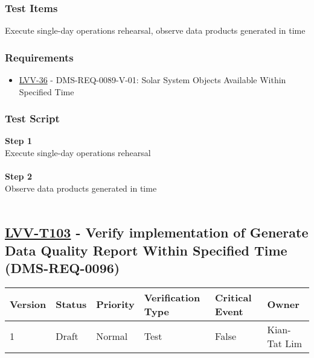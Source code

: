 \hypertarget{test-items-78}{%
\subsubsection{Test Items}\label{test-items-78}}

Execute single-day operations rehearsal, observe data products generated
in time

\hypertarget{requirements-79}{%
\subsubsection{Requirements}\label{requirements-79}}

\begin{itemize}
\tightlist
\item
  \href{https://jira.lsstcorp.org/browse/LVV-36}{LVV-36} -
  DMS-REQ-0089-V-01: Solar System Objects Available Within Specified
  Time
\end{itemize}

\hypertarget{test-script-79}{%
\subsubsection{Test Script}\label{test-script-79}}

\textbf{Step 1}\\
Execute single-day operations rehearsal\\
~\\
\textbf{Step 2}\\
\hspace*{0.333em}Observe data products generated in time\\
~\\

\hypertarget{lvv-t103---verify-implementation-of-generate-data-quality-report-within-specified-time-dms-req-0096}{%
\subsection{\texorpdfstring{\href{https://jira.lsstcorp.org/secure/Tests.jspa\#/testCase/LVV-T103}{LVV-T103}
- Verify implementation of Generate Data Quality Report Within Specified
Time
(DMS-REQ-0096)}{LVV-T103 - Verify implementation of Generate Data Quality Report Within Specified Time (DMS-REQ-0096)}}\label{lvv-t103---verify-implementation-of-generate-data-quality-report-within-specified-time-dms-req-0096}}

\begin{longtable}[]{@{}llllll@{}}
\toprule
Version & Status & Priority & Verification Type & Critical Event &
Owner\tabularnewline
\midrule
\endhead
1 & Draft & Normal & Test & False & Kian-Tat Lim\tabularnewline
\bottomrule
\end{longtable}

